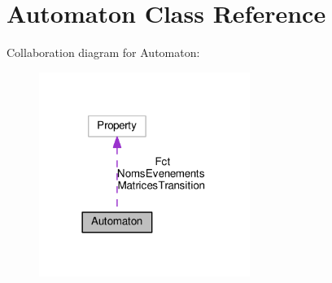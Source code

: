 \hypertarget{class_automaton}{}\section{Automaton Class Reference}
\label{class_automaton}


Collaboration diagram for Automaton\+:
\nopagebreak
\begin{figure}[H]
\begin{center}
\leavevmode
\includegraphics[width=194pt]{class_automaton__coll__graph}
\end{center}
\end{figure}
